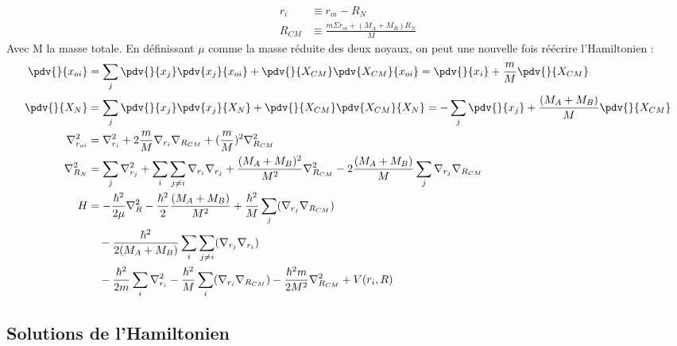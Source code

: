 \begin{equation*}
    \begin{split}
        r_i &\equiv r_{oi} - R_N \\
        R_{CM} &\equiv \frac{m\Sigma r_{oi}+(M_A+M_B)R_N}{M}
    \end{split}
\end{equation*}
Avec M la masse totale.\newline
En définissant $\mu$ comme la masse réduite des deux noyaux, on peut une nouvelle fois réécrire l'Hamiltonien :
\begin{equation*}
    \begin{split}
        \pdv{}{x_{oi}} &= \sum\limits_j\pdv{}{x_j}\pdv{x_j}{x_{oi}} + \pdv{}{X_{CM}}\pdv{X_{CM}}{x_{oi}} = \pdv{}{x_i} + \frac{m}{M}\pdv{}{X_{CM}} \\
        \pdv{}{X_N} &= \sum\limits_j\pdv{}{x_j}\pdv{x_j}{X_N} + \pdv{}{X_{CM}}\pdv{X_{CM}}{X_N} = - \sum\limits_j\pdv{}{x_j} + \frac{(M_A + M_B)}{M}\pdv{}{X_{CM}} \\
        \nabla^2_{r_{oi}} &= \nabla^2_{r_{i}} + 2\frac{m}{M}\nabla_{r_i}\nabla_{R_{CM}} + (\frac{m}{M})^2\nabla^2_{R_{CM}} \\
        \nabla^2_{R_N} &= \sum\limits_j\nabla^2_{r_j} + \sum\limits_i\sum\limits_{j\neq i}\nabla_{r_i}\nabla_{r_j} + \frac{(M_A + M_B)^2}{M^2}\nabla^2_{R_{CM}} - 2\frac{(M_A + M_B)}{M}\sum\limits_j \nabla_{r_j}\nabla_{R_{CM}}\\
        H &= -\frac{\hbar^2}{2\mu}\nabla^2_R - \frac{\hbar^2}{2}\frac{(M_A + M_B)}{M^2} + \frac{\hbar^2}{M}\sum\limits_j(\nabla_{r_j}\nabla_{R_{CM}}) \\
        &\quad -\frac{\hbar^2}{2(M_A + M_B)}\sum\limits_i\sum\limits_{j\neq i}(\nabla_{r_j}\nabla_{r_i}) \\
        &\quad -\frac{\hbar^2}{2m}\sum\limits_i \nabla^2_{r_{i}} - \frac{\hbar^2}{M}\sum\limits_i(\nabla_{r_i}\nabla_{R_{CM}}) - \frac{\hbar^2 m}{2M^2}\nabla^2_{R_{CM}} + V(r_i, R) \\
    \end{split}
\end{equation*}

\subsection{Solutions de l'Hamiltonien}\label{Solutions de l'hamiltonien}

